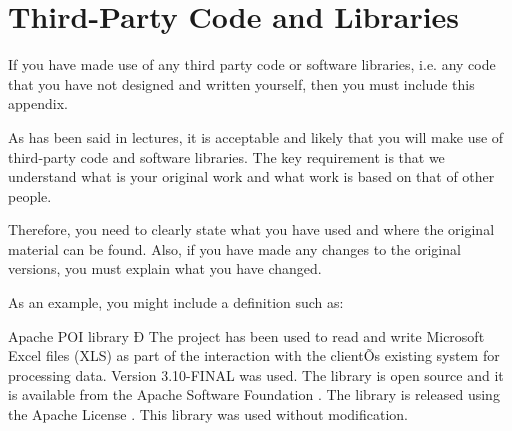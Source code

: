 \chapter{Third-Party Code and Libraries}

If you have made use of any third party code or software libraries, i.e. any code that you have not designed and written yourself, then you must include this appendix. 

As has been said in lectures, it is acceptable and likely that you will make use of third-party code and software libraries. The key requirement is that we understand what is your original work and what work is based on that of other people. 

Therefore, you need to clearly state what you have used and where the original material can be found. Also, if you have made any changes to the original versions, you must explain what you have changed. 

As an example, you might include a definition such as: 

Apache POI library Ð The project has been used to read and write Microsoft Excel files (XLS) as part of the interaction with the clientÕs existing system for processing data. Version 3.10-FINAL was used. The library is open source and it is available from the Apache Software Foundation 
\cite{apache_poi}. The library is released using the Apache License 
\cite{apache_license}. This library was used without modification. 
